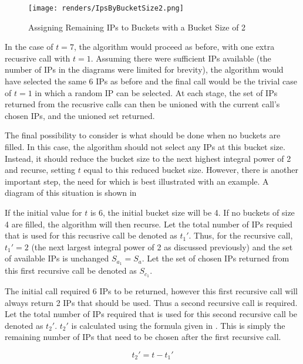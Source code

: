 \begin{figure}[H]
      \centering
      \texttt{[image: renders/IpsByBucketSize2.png]}
      \caption{Assigning Remaining IPs to Buckets with a Bucket Size of 2}
      \label{fig:exampleIpsByBucket2}
\end{figure}

In the case of $t = 7$, the algorithm would proceed as before, with one extra recusrive call with $t = 1$. Assuming there were sufficient IPs available (the number of IPs in the diagrams were limited for brevity), the algorithm would have selected the same 6 IPs as before and the final call would be the trivial case of $t = 1$ in which a random IP can be selected. At each stage, the set of IPs returned from the recusrive calls can then be unioned with the current call's chosen IPs, and the unioned set returned. 

The final possibility to consider is what should be done when no buckets are filled. In this case, the algorithm should not select any IPs at this bucket size. Instead, it should reduce the bucket size to the next highest integral power of 2 and recurse, setting $t$ equal to this reduced bucket size. However, there is another important step, the need for which is best illustrated with an example. A diagram of this situation is shown in 

If the initial value for $t$ is 6, the initial bucket size will be 4. If no buckets of size 4 are filled, the algorithm will then recurse. Let the total number of IPs requied that is used for this recusrive call be denoted as $t_1'$. Thus, for the recursive call, $t_1' = 2$ (the next largest integral power of 2 as discussed previously) and the set of available IPs is unchanged $S_{a_1} = S_a$. Let the set of chosen IPs returned from this first recursive call be denoted as $S_{c_1}$.

The initial call required 6 IPs to be returned, however this first recursive call will always return 2 IPs that should be used. Thus a second recursive call is required. Let the total number of IPs required that is used for this second recursive call be denoted as $t_2'$. $t_2'$ is calculated using the formula given in . This is simply the remaining number of IPs that need to be chosen after the first recursive call. 

\begin{equation}\label{eq:secondRecurseT2}
t_2' = t - t_1'
\end{equation}

